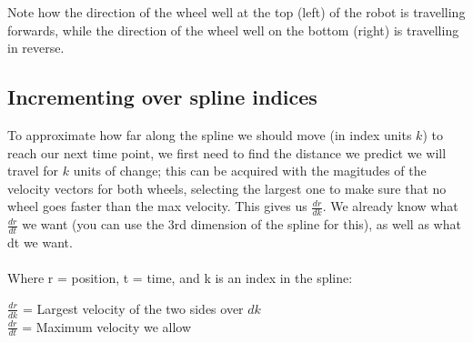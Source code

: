 \documentclass[12pt, english]{article}
\begin{document}
\begin{center}
\end{center}

Note how the direction of the wheel well at the top (left) of the robot is travelling forwards, while the direction of the wheel well on the bottom (right) is travelling in reverse.

\subsection{Incrementing over spline indices}
To approximate how far along the spline we should move (in index units $k$) to reach our next time point, we first need to find the distance we predict we will travel for $k$ units of change; this can be acquired with the magitudes of the velocity vectors for both wheels, selecting the largest one to make sure that no wheel goes faster than the max velocity. This gives us $\frac{dr}{dk}$. We already know what $\frac{dr}{dt}$ we want (you can use the 3rd dimension of the spline for this), as well as what dt we want. \\
\\
\noindent
Where r = position, t = time, and k is an index in the spline:

$\frac{dr}{dk}$ = Largest velocity of the two sides over $dk$ \\

$\frac{dr}{dt}$ = Maximum velocity we allow \\
\end{document}
